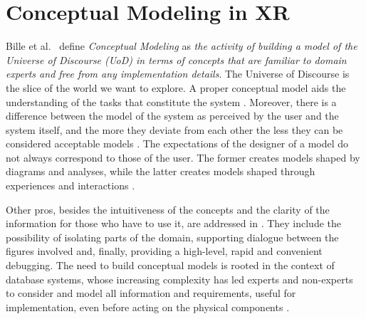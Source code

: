 \section{Conceptual Modeling in XR}
\label{sec:background-conceptual}

Bille et al.~\cite{bille_conceptual_2007} define \emph{Conceptual Modeling} as \textit{the activity of building a model of the Universe of Discourse (UoD) in terms of concepts that are familiar to domain experts and free from any implementation details}. The Universe of Discourse is the slice of the world we want to explore. 
A proper conceptual model aids the understanding of the tasks that constitute the system \cite{norman_design_2013}. Moreover, there is a difference between the model of the system as perceived by the user and the system itself, and the more they deviate from each other the less they can be considered acceptable models \cite{rosson_usability_2002}. The expectations of the designer of a model do not always correspond to those of the user. The former creates models shaped by diagrams and analyses, while the latter creates models shaped through experiences and interactions \cite{laviola_jr_3d_2017}. 

Other pros, besides the intuitiveness of the concepts and the clarity of the information for those who have to use it, are addressed in \cite{bille_conceptual_2007}. They include the possibility of isolating parts of the domain, supporting dialogue between the figures involved and, finally, providing a high-level, rapid and convenient debugging. 
The need to build conceptual models is rooted in the context of database systems, whose increasing complexity has led experts and non-experts to consider and model all information and requirements, useful for implementation, even before acting on the physical components \cite{connolly_database_2005}.

